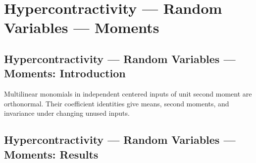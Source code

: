 \section{Hypercontractivity --- Random Variables --- Moments}
\subsection*{Hypercontractivity --- Random Variables --- Moments: Introduction}
Multilinear monomials in independent centered inputs of unit second moment are orthonormal. Their coefficient identities give means, second moments, and invariance under changing unused inputs.

\subsection*{Hypercontractivity --- Random Variables --- Moments: Results}

